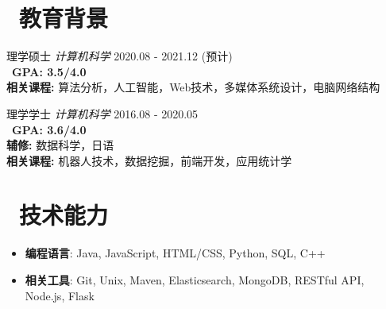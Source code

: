 \documentclass{resume}
\begin{document}



\vspace{-6pt}

\section{\faGraduationCap\ 教育背景}
{理学硕士 \textit{计算机科学} \hfill 2020.08 - 2021.12 (预计)}\\
\ \textbf{GPA: 3.5/4.0} \\
{\footnotesize \textbf{相关课程: }算法分析，人工智能，Web技术，多媒体系统设计，电脑网络结构}

{理学学士 \textit{计算机科学} \hfill 2016.08 - 2020.05}\\
\ \textbf{GPA: 3.6/4.0} \\
{\footnotesize \textbf{辅修: }数据科学，日语} \\
{\footnotesize \textbf{相关课程: }机器人技术，数据挖掘，前端开发，应用统计学}
\vspace{-3pt}

\section{\faCogs\ 技术能力}
\begin{itemize}[parsep=0.2ex]
  \item \textbf{编程语言}: Java, JavaScript, HTML/CSS, Python, SQL, C++
  \item \textbf{相关工具}: Git, Unix, Maven, Elasticsearch, MongoDB, RESTful API, Node.js, Flask
\end{itemize}
\end{document}
